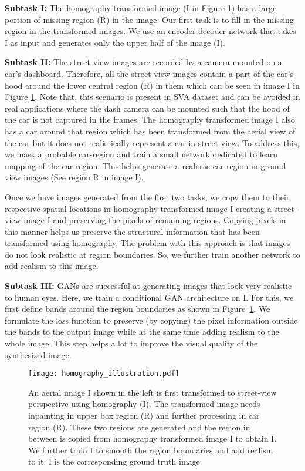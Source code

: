 \documentclass[times,twocolumn,final,authoryear]{elsarticle_modified}
\begin{document}
\textbf{Subtask I: }
The homography transformed image (I in Figure \ref{fig:regions}) has a large portion of missing region (R) in the image. Our first task is to fill in the missing region in the transformed images. We use an encoder-decoder network that takes I as input and generates only the upper half of the image (I). 

\textbf{Subtask II: }
The street-view images are recorded by a camera mounted on a car's dashboard. Therefore, all the street-view images contain a part of the car's hood around the lower central region (R) in them which can be seen in image I in Figure \ref{fig:regions}. Note that, this scenario is present in SVA dataset and can be avoided in real applications where the dash camera can be mounted such that the hood of the car is not captured in the frames. The homography transformed image I also has a car around that region which has been transformed from the aerial view of the car but it does not realistically represent a car in street-view. To address this, we mask a probable car-region and train a small network dedicated to learn mapping of the car region. This helps generate a realistic car region in ground view images (See region R in image I). 

Once we have images generated from the first two tasks, we copy them to their respective spatial locations in homography transformed image I creating a street-view image I and preserving the pixels of remaining regions.
Copying pixels in this manner helps us preserve the structural information that has been transformed using homography. The problem with this approach is that images do not look realistic at region boundaries. So, we further train another network to add realism to this image. 

\textbf{Subtask III: }
GANs are successful at generating images that look very realistic to human eyes. Here, we train a conditional GAN architecture on I.
For this, we first define bands around the region boundaries as shown in Figure~\ref{fig:regions}. We formulate the loss function to preserve (by copying) the pixel information outside the bands to the output image while at the same time adding realism to the whole image. This step helps a lot to improve the visual quality of the synthesized image. 

\begin{figure}[!t]
\centering
\texttt{[image: homography\_illustration.pdf]}
\caption{\label{fig:regions} An aerial image I shown in the left is first transformed to street-view perspective using homography (I). The transformed image needs inpainting in upper box region (R) and further processing in car region (R). These two regions are generated and the region in between is copied from homography transformed image I to obtain I. We further train I to smooth the region boundaries and add realism to it. I is the corresponding ground truth image.
}
\vspace{-15pt}
\end{figure}
\end{document}
